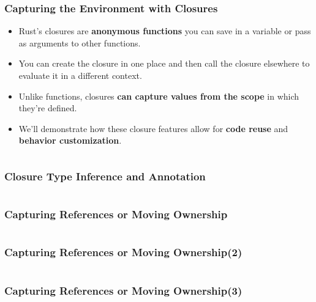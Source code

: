 \documentclass{beamer}
\begin{document}
\begin{frame}[fragile]
	\frametitle{Capturing the Environment with Closures}
	\begin{itemize}
		\item Rust’s closures are \textbf{anonymous functions} you can save in a variable or pass as arguments to other functions. 
		\item You can create the closure in one place and then call the closure elsewhere to evaluate it in a different context.
		\item  Unlike functions, closures \textbf{can capture values from the scope} in which they’re defined. 
		\item  We’ll demonstrate how these closure features allow for \textbf{code reuse} and \textbf{behavior customization}.
	\end{itemize}
\inputminted{rust}{./code/closure1.rs}
\end{frame}

\begin{frame}[fragile]
	\frametitle{Closure Type Inference and Annotation}
	\inputminted{rust}{./code/closure.rs}
\end{frame}


\begin{frame}[fragile]
	\frametitle{Capturing References or Moving Ownership}
	\inputminted{rust}{./code/closure2.rs}
\end{frame}

\begin{frame}[fragile]
	\frametitle{Capturing References or Moving Ownership(2)}
	\inputminted{rust}{./code/closure3.rs}
\end{frame}

\begin{frame}[fragile]
	\frametitle{Capturing References or Moving Ownership(3)}
	\inputminted{rust}{./code/closure4.rs}
\end{frame}
\end{document}
